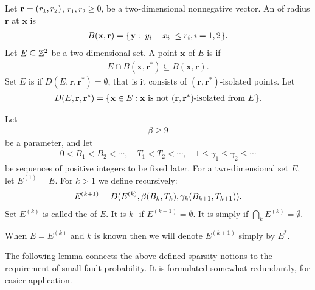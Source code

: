 \documentclass[11pt]{memoir}
\theoremstyle{definition} %
\renewcommand{\le}{\leq}
\renewcommand{\ge}{\geq}
\renewcommand{\vek}[1]{\mathbf{#1}}
\def\B{B}
\newcommand{\Tu}{T}
\begin{document}
\begin{definition}
Let \( \vek{r}=\pair{r_{1}}{r_{2}} \), \( r_{1}, r_{2}\ge 0 \),
be a two-dimensional nonnegative vector.
An  of radius \( \vek{r} \)  at \( \vek{x} \) is
\begin{align}\label{eq:ball1}
  B(\vek{x},\vek{r}) = \setOf{\vek{y}}{\abs{y_{i} - x_{i}} \le r_{i}, i=1,2}.
\end{align}  
Let \( E\subseteq \mathbb{Z}^{2} \) be a two-dimensional set.
A point \( \vek{x} \) of \( E \) is \df{\( \pair{\vek{r}}{\vek{r}^{*}} \)-isolated} if
\begin{align*}
  E \cap B(\vek{x},\vek{r}^{*})\subseteq B(\vek{x}, \vek{r}).
 \end{align*}
Set \( E \) is \df{\( (\vek{r}, \vek{r}^{*}) \)-sparse} 
if \( D(E, \vek{r}, \vek{r}^{*})=\emptyset \), that is 
it consists of \( (\vek{r}, \vek{r^{*}}) \)-isolated points.
Let
\begin{align}
  D(E,\vek{r}, \vek{r}^{*}) =
     \setOf{\vek{x}\in E}{\vek{x} \txt{ is not } (\vek{r}, \vek{r}^{*})\txt{-isolated
  from } E}.
\end{align}
\end{definition}

\begin{definition}[Sparsity]\label{def:sparsity}
Let
\begin{align}\label{eq:beta}
 \beta\ge 9
 \end{align}
 be a parameter, and let 
\begin{align*}
  0<\B_{1}<\B_{2}<\dotsm,\quad
  \Tu_{1}<\Tu_{2}<\dotsm,\quad
  1\le\gamma_{1}\le\gamma_{2}\le\dotsm
\end{align*}
be sequences of positive integers to be fixed later.
For a two-dimensional set \( E \), let \( E^{(1)} = E \).
For \( k>1 \) we define recursively:
\begin{align}\label{eq:noise^k}
    E^{(k+1)} = D(E^{(k)}, \beta\pair{\B_{k}}{\Tu_{k}}, \gamma_{k}\pair{\B_{k+1}}{\Tu_{k+1}}).
\end{align}
Set \( E^{(k)} \) is called the  of \( E \).
It is \( k \)- if \( E^{(k+1)}=\emptyset \).
It is simply  if \( \bigcap_{k}E^{(k)}=\emptyset \).

When \( E=E^{(k)} \) and \( k \) is known
then we will denote \( E^{(k+1)} \) simply by \( E^{*} \).
\end{definition}

The following lemma connects the above defined sparsity notions to the requirement
of small fault probability.
It is formulated somewhat redundantly, for easier application.
\end{document}
